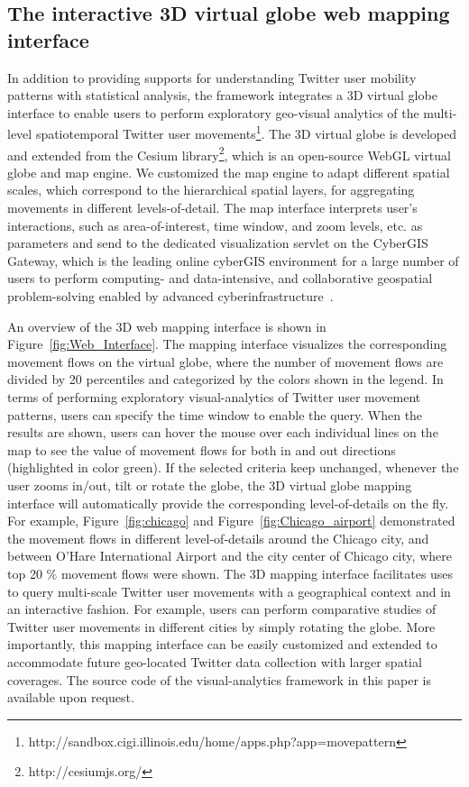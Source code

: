 \documentclass[ijgi,article,accept,moreauthors,pdftex,10pt,a4paper]{mdpi}
\theoremstyle{mdpi}
\newcounter{ex}
\newcounter{re}
\theoremstyle{mdpidefinition}
\begin{document}
\subsection{The interactive 3D virtual globe web mapping interface}
In addition to providing supports for understanding Twitter user mobility patterns with statistical analysis, the framework integrates a 3D virtual globe interface to enable users to perform exploratory geo-visual analytics of the multi-level spatiotemporal Twitter user movements\footnote{http://sandbox.cigi.illinois.edu/home/apps.php?app=movepattern}. 
The 3D virtual globe is developed and extended from the Cesium library\footnote{http://cesiumjs.org/}, which is an open-source WebGL virtual globe and map engine.
We customized the map engine to adapt different spatial scales, which correspond to the hierarchical spatial layers, for aggregating movements in different levels-of-detail.
The map interface interprets user's interactions, such as area-of-interest, time window, and zoom levels, etc. as parameters and send to the dedicated visualization servlet on the CyberGIS Gateway, which is the leading online cyberGIS environment for a large number of users to perform computing- and data-intensive, and collaborative geospatial problem-solving enabled by advanced cyberinfrastructure~\cite{liu2014cybergis}.

An overview of the 3D web mapping interface is shown in Figure~\ref{fig:Web_Interface}.
The mapping interface visualizes the corresponding movement flows on the virtual globe, where the number of movement flows are divided by 20 percentiles and categorized by the colors shown in the legend.
In terms of performing exploratory visual-analytics of Twitter user movement patterns, users can specify the time window to enable the query. 
When the results are shown, users can hover the mouse over each individual lines on the map to see the value of movement flows for both in and out directions (highlighted in color green).
If the selected criteria keep unchanged, whenever the user zooms in/out, tilt or rotate the globe, the 3D virtual globe mapping interface will automatically provide the corresponding level-of-details on the fly.
For example, Figure~\ref{fig:chicago} and Figure~\ref{fig:Chicago_airport} demonstrated the movement flows in different level-of-details around the Chicago city, and between O'Hare International Airport and the city center of Chicago city, where top 20 $\%$ movement flows were shown.
The 3D mapping interface facilitates uses to query multi-scale Twitter user movements with a geographical context and in an interactive fashion.
For example, users can perform comparative studies of Twitter user movements in different cities by simply rotating the globe. 
More importantly, this mapping interface can be easily customized and extended to accommodate future geo-located Twitter data collection with larger spatial coverages.
The source code of the visual-analytics framework in this paper is available upon request.
\end{document}
